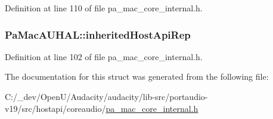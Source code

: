Definition at line 110 of file pa\+\_\+mac\+\_\+core\+\_\+internal.\+h.

\subsubsection[{\texorpdfstring{inherited\+Host\+Api\+Rep}{inheritedHostApiRep}}]{ Pa\+Mac\+A\+U\+H\+A\+L\+::inherited\+Host\+Api\+Rep}\hypertarget{struct_pa_mac_a_u_h_a_l_abe5cf67f9992b647d350cd9fb890a081}{}\label{struct_pa_mac_a_u_h_a_l_abe5cf67f9992b647d350cd9fb890a081}


Definition at line 102 of file pa\+\_\+mac\+\_\+core\+\_\+internal.\+h.



The documentation for this struct was generated from the following file\+:\begin{DoxyCompactItemize}
\item 
C\+:/\+\_\+dev/\+Open\+U/\+Audacity/audacity/lib-\/src/portaudio-\/v19/src/hostapi/coreaudio/\hyperlink{pa__mac__core__internal_8h}{pa\+\_\+mac\+\_\+core\+\_\+internal.\+h}\end{DoxyCompactItemize}
